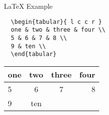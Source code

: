\begin{frame}[t,fragile]{LaTeX Example}


\begin{lstlisting}
  \begin{tabular}{ l c c r }
  one & two & three & four \\
  5 & 6 & 7 & 8 \\
  9 & ten \\
  \end{tabular}
\end{lstlisting}

\begin{tabular}{ l | c || c r }
one & two & three & four \\ \hline
5 & 6 & 7 & 8 \\
9 & ten \\
\end{tabular}
\end{frame}